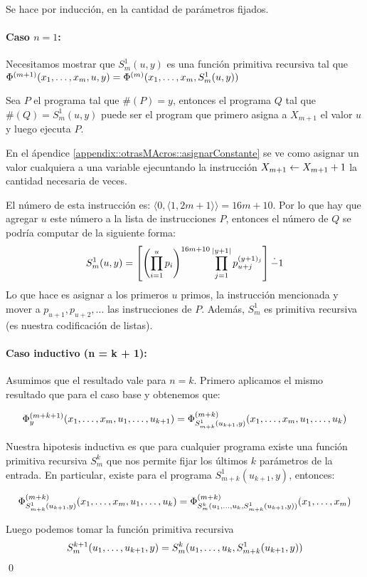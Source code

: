 \begin{demo}
	Se hace por inducción, en la cantidad de parámetros fijados.
	
	\paragraph{Caso $n = 1$:} Necesitamos mostrar que $S_m^1(u,y)$ es una función primitiva recursiva tal que $\Phi^{(m+1)}(x_1,\dots, x_{m},u,y) = \Phi^{(m)}(x_1,\dots, x_{m},S_m^1(u,y))$
	
	Sea $P$ el programa tal que $\#(P) = y$, entonces el programa $Q$ tal que $\#(Q) = S_m^1(u,y)$ puede ser el program que primero asigna a $X_{m+1}$ el valor $u$ y luego ejecuta $P$.
	
	En el ápendice \ref{appendix::otrasMAcros::asignarConstante} se ve como asignar un valor cualquiera a una variable ejecuntando la instrucción $X_{m+1} \leftarrow X_{m+1} + 1$ la cantidad necesaria de veces.
	
	El número de esta instrucción es: $\langle 0,\langle 1, 2m+1\rangle\rangle = 16m + 10$. Por lo que hay que agregar $u$ este número a la lista de instrucciones $P$, entonces el número de $Q$ se podría computar de la siguiente forma:
	$$S_m^1(u,y) = \left[
	\left(\prod_{i=1}^{u}p_i\right)^{16m+10} \prod_{j=1}^{|y+1|}p_{u+j}^{(y+1)_j}\right] \dot{-} 1$$
	Lo que hace es asignar a los primeros $u$ primos, la instrucción mencionada y mover a $p_{u+1},p_{u+2},\dots$ las instrucciones de $P$. Además, $S_m^1$ es primitiva recursiva (es nuestra codificación de listas).

	\paragraph{Caso inductivo (n = k  + 1):} Asumimos que el resultado vale para $n = k$. Primero aplicamos el mismo resultado que para el caso base y obtenemos que:
		\end{demo}
\begin{demoPart}
	$$\Phi_y^{(m + k + 1)}(x_1,\dots, x_{m},u_1,\dots, u_{k+1}) = \Phi_{S_{m+k}^1(u_{k+1},y)}^{(m + k)}(x_1,\dots, x_{m},u_1,\dots, u_{k})$$
	
	Nuestra hipotesis inductiva es que para cualquier programa existe una función primitiva recursiva $S_m^k$ que nos permite fijar los últimos $k$ parámetros de la entrada. En particular, existe para  el programa $S_{m+k}^1(u_{k+1}, y)$, entonces:
	
	$$\Phi_{S_{m+k}^1(u_{k+1},y)}^{(m + k)}(x_1,\dots, x_{m},u_1,\dots, u_{k}) = \Phi_{S_{m}^k(u_1,\dots, u_{k},S_{m+k}^1(u_{k+1},y))}^{(m + k)}(x_1,\dots, x_{m}) $$
	
	Luego podemos tomar la función primitiva recursiva $$S_m^{k+1}(u_1,\dots, u_{k+1}, y) = S_{m}^k(u_1,\dots, u_{k},S_{m+k}^1(u_{k+1},y))$$ \qed
\end{demoPart}

